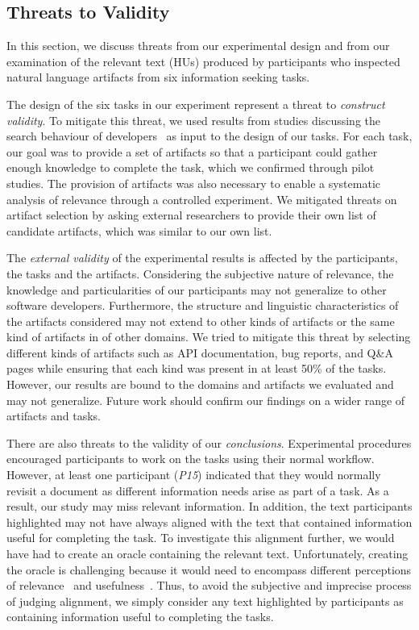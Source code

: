 
\subsection{Threats to Validity}
\label{cp3:threats}


In this section, we discuss threats from our experimental design 
and from our
examination of the relevant text (HUs) produced by participants who 
inspected natural language artifacts from six information seeking tasks. 



The design of the six tasks in our experiment represent a threat to
\textit{construct validity}.  To mitigate this threat, we used results from studies discussing the search
behaviour of developers~\cite{umarji2008archetypal, Li2013, Xia2017} as
input to the design of our tasks.
For each task, our goal was to provide a set of artifacts so that a
participant could gather enough knowledge to complete the task, which
we confirmed through pilot studies.  The provision of artifacts was also
necessary to enable a systematic analysis of relevance through a
controlled experiment. We mitigated threats on artifact
selection by asking external researchers to provide their own list of
candidate artifacts, which was similar to our own list.



The \textit{external validity} of the experimental results is affected
by the participants, the tasks and the artifacts.  Considering the
subjective nature of relevance, the knowledge and particularities of
our participants may not generalize to other software developers.
Furthermore, the structure and linguistic characteristics of the
artifacts considered may not extend to other kinds of artifacts or the
same kind of artifacts in of other domains.  We tried to mitigate this
threat by selecting different kinds of artifacts such as API
documentation, bug reports, and Q\&A pages while 
ensuring that each kind was present in at least
50\% of the tasks. 
However, our results
are bound to the domains and artifacts we evaluated and may not generalize.
Future work should confirm our findings on a wider range of artifacts and tasks.


There are also threats to the validity of our
\textit{conclusions}.
Experimental procedures encouraged participants to work on the tasks using their normal workflow.
However, at least one participant (\textit{P15}) indicated that they would normally
revisit a document as different information needs arise as part of a task.
As a result, our study may miss relevant information.
In addition, the text participants highlighted may not have always aligned with the text that contained information useful for completing the task.
To investigate this alignment further, we would have had to create an oracle containing the relevant text.
Unfortunately, creating the oracle is challenging because it would need to encompass different perceptions of relevance~\cite{Pirolli1999,saracevic1975,Nenkova2004} and usefulness~\cite{Freund2013, Freund2015}.
Thus, to avoid the subjective and imprecise process of judging alignment, we simply consider any text highlighted by participants as containing information useful to completing the tasks.




